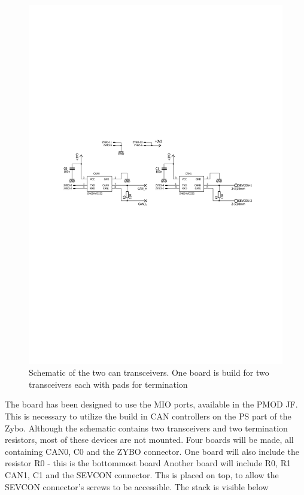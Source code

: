 \begin{figure}[h!]
	\centering
	\includegraphics[width = 0.7\linewidth]{graphics/CAN_Schematic}
	\caption{Schematic of the two can transceivers. One board is build for two transceivers each with pads for termination}
	\label{fig:CAN_Schematic}
\end{figure}

The board has been designed to use the MIO ports, available in the PMOD JF. 
This is necessary to utilize the build in CAN controllers on the PS part of the Zybo.
Although the schematic contains two transceivers and two termination resistors, most of these devices are not mounted. 
Four boards will be made, all containing CAN0, C0 and the ZYBO connector. 
One board will also include the resistor R0 - this is the bottommost board
Another board will include R0, R1 CAN1, C1 and the SEVCON connector.
Ths is placed on top, to allow the SEVCON connector's screws to be accessible. 
The stack is visible below

